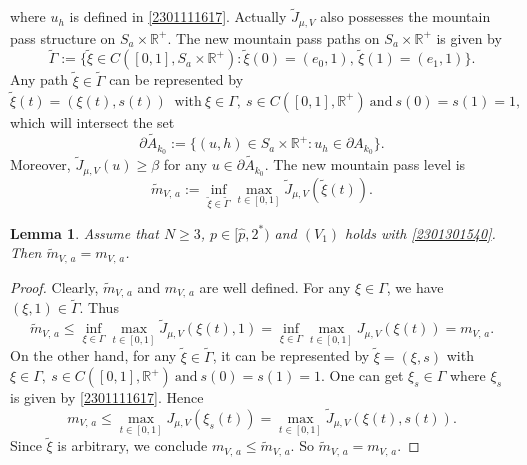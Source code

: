 \documentclass[10pt]{article}
\numberwithin{equation}{section}
\newtheorem{lemma}[theorem]{Lemma}
\numberwithin{equation}{section}
\begin{document}
where $u_h$ is defined in \eqref{2301111617}. Actually $\widetilde{J}_{\mu, V}$ also possesses the mountain pass structure on $S_a\times \mathbb{R}^+$. The new mountain pass paths on $S_a\times \mathbb{R}^+$ is given by
\[
\widetilde{\Gamma}:=\{\widetilde{\xi}\in C([0,1], S_a\times \mathbb{R}^+): \widetilde{\xi}(0)=(e_0, 1),\, \widetilde{\xi}(1)=(e_1,1)\}.
\]
Any path $\widetilde{\xi}\in\widetilde{\Gamma}$ can be represented by
\[
\widetilde{\xi}(t)=(\xi(t), s(t))\;\; \text{with}~\xi\in \Gamma,~s\in C([0,1], \mathbb{R}^+)~\text{and}~s(0)=s(1)=1,
\]
which will intersect the set
\[
\widetilde{\partial A_{k_0}}:=\{(u, h)\in S_a\times \mathbb{R}^+: u_h\in \partial A_{k_0}\}.
\]
Moreover, $\widetilde{J}_{\mu, V}(u)\ge \beta$ for any $u\in \widetilde{\partial A_{k_0}}$. The new mountain pass level is
\[
\widetilde{m}_{V,\, a} :=\underset{\widetilde{\xi}\in\widetilde{\Gamma}}{\inf} \underset{t\in [0,1] }{\max} {\widetilde{J}_{\mu, V}(\widetilde{\xi}(t))}.
\]
\begin{lemma}\label{2302152315}
Assume that $N\ge 3$, $p\in [\hat{p}, 2^*)$ and $(V_1)$ holds with \eqref{2301301540}. Then $\widetilde{m}_{V,\, a}={m}_{V,\, a}$.
\end{lemma}
\begin{proof}
Clearly, $\widetilde{m}_{V,\, a}$ and ${m}_{V,\, a}$ are well defined. For any $\xi\in\Gamma$, we have $(\xi, 1)\in\widetilde{\Gamma}$. Thus
\[
\widetilde{m}_{V,\, a} \le \underset{\xi\in\Gamma}{\inf} \underset{t\in [0,1] }{\max} {\widetilde{J}_{\mu, V}(\xi(t),1)}=\underset{\xi\in\Gamma}{\inf} \underset{t\in [0,1] }{\max} {J_{\mu, V}(\xi(t))}={m}_{V,\, a} .
\]
On the other hand, for any $\widetilde{\xi}\in\widetilde{\Gamma}$, it can be represented by $\widetilde{\xi}=(\xi,s)$ with $\xi\in \Gamma,~s\in C([0,1], \mathbb{R}^+)~\text{and}~s(0)=s(1)=1$. One can get $\xi_s\in \Gamma$ where $\xi_s$ is given by \eqref{2301111617}. Hence
\[
{m}_{V,\, a} \le \underset{t\in[0,1]}{\max}J_{\mu, V}(\xi_s(t))=\underset{t\in[0,1]}{\max}\widetilde{J}_{\mu, V}(\xi(t),s(t)).
\]
Since $\widetilde{\xi}$ is arbitrary, we conclude ${m}_{V,\, a} \le \widetilde{m}_{V,\, a} $. So $\widetilde{m}_{V,\, a}={m}_{V,\, a}$.
\end{proof}
\end{document}
